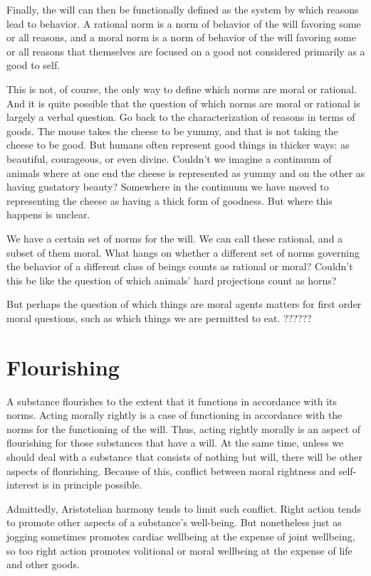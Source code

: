 Finally, the will can then be functionally defined as the system by which reasons lead to behavior. A rational norm is a norm of behavior
of the will favoring some or all reasons, and a moral norm is a norm of behavior of the will favoring some or all reasons that themselves 
are focused on  a good not considered primarily as a good to self. 

This is not, of course, the only way to define which norms are moral or rational. And it is quite possible that the question of which
norms are moral or rational is largely a verbal question. Go back to the characterization of reasons in terms of goods. The mouse takes
the cheese to be yummy, and that is not taking the cheese to be good. But humans often represent good things in thicker ways: as
beautiful, courageous, or even divine. Couldn't we imagine a continuum of animals where at one end the cheese is represented as 
yummy and on the other as having gustatory beauty? Somewhere in the continuum we have moved to representing the cheese as having a 
thick form of goodness. But where this happens is unclear. 

We have a certain set of norms for the will. We can call these rational, and a subset of them moral. What hangs on whether a different
set of norms governing the behavior of a different class of beings counts as rational or moral? Couldn't this be like the question of
which animals' hard projections count as horns? 

But perhaps the question of which things are moral agents matters for first order moral questions, such as which things we are
permitted to eat. ??????



\section{Flourishing}
A substance flourishes to the extent that it functions in accordance with its norms.  Acting morally rightly is
a case of functioning in accordance with the norms for the functioning of the will. Thus, acting rightly morally is an aspect of flourishing
for those substances that have a will. At the same time, unless we should deal with a substance that consists of nothing but will, there will be other
aspects of flourishing. Because of this, conflict between moral rightness and self-interest is in principle possible.

Admittedly, Aristotelian harmony tends to limit such conflict. Right action tends to promote other aspects of a substance's well-being. But nonetheless
just as jogging sometimes promotes cardiac wellbeing at the expense of joint wellbeing, so too right action promotes volitional or moral wellbeing at the expense
of life and other goods.

